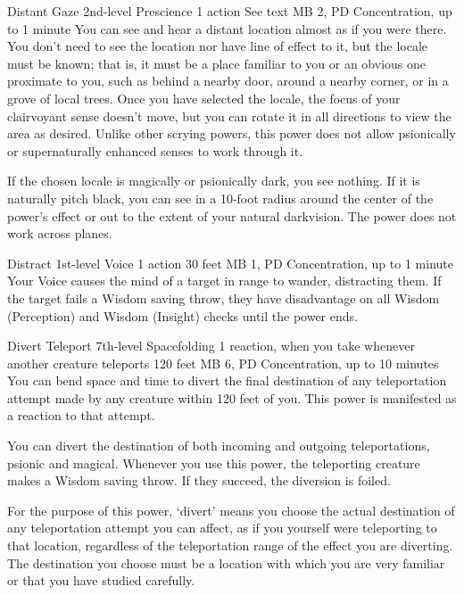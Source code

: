   \DndPowerHeader%
  {Distant Gaze}
  {2nd-level Prescience}
  {1 action}
  {See text}
  {MB 2, PD \lvltwo}
  {Concentration, up to 1 minute}
  You can see and hear a distant location
  almost as if you were there.
  You don't need to see the location
  nor have line of effect to it,
  but the locale must be known;
  that is, it must be
  a place familiar to you or an obvious one
  proximate to you,
  such as behind a nearby door,
  around a nearby corner,
  or in a grove of local trees.
  Once you have selected the locale,
  the focus of your clairvoyant sense doesn't move,
  but you can rotate it in all directions
  to view the area as desired.
  Unlike other scrying powers,
  this power does not allow psionically or supernaturally
  enhanced senses to work through it.

  If the chosen locale is magically or psionically dark,
  you see nothing.
  If it is naturally pitch black,
  you can see in a 10-foot radius around the center
  of the power's effect or out to the extent
  of your natural darkvision.
  The power does not work across planes.

\DndPowerHeader%
  {Distract}
  {1st-level Voice}
  {1 action}
  {30 feet}
  {MB 1, PD \lvlone}
  {Concentration, up to 1 minute}
Your Voice causes the mind of a target in range to wander,
distracting them.
If the target fails a Wisdom saving throw,
they have disadvantage on all Wisdom (Perception)
and Wisdom (Insight) checks until the power ends.

\DndPowerHeader%
  {Divert Teleport}
  {7th-level Spacefolding}
  {1 reaction, when you take whenever another creature
  teleports}
  {120 feet}
  {MB 6, PD \lvlseven}
  {Concentration, up to 10 minutes}
  You can bend space and time to
  divert the final destination of any teleportation attempt
  made by any creature within 120 feet of you.
  This power is manifested as a reaction to that attempt.

  You can divert the destination of both incoming and outgoing
  teleportations,
  psionic and magical.
  Whenever you use this power,
  the teleporting creature makes a Wisdom saving throw.
  If they succeed, the diversion is foiled.
  
  For the purpose of this power,
  `divert' means you choose the actual destination
  of any teleportation attempt you can affect,
  as if you yourself were teleporting to that location,
  regardless of the teleportation range
  of the effect you are diverting.
  The destination you choose must be a location
  with which you are very familiar
  or that you have studied carefully.
  
